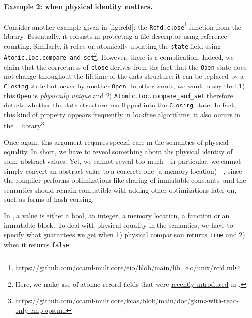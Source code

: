 \paragraph{Example 2: when physical identity matters.}

Consider another example given in \cref{fig:rcfd}: the \texttt{Rcfd.close}\footnote{\url{https://github.com/ocaml-multicore/eio/blob/main/lib_eio/unix/rcfd.ml}} function from the \Eio~\cite{eio} library.
Essentially, it consists in protecting a file descriptor using reference counting.
Similarly, it relies on atomically updating the \texttt{state} field using \texttt{Atomic.Loc.compare_and_set}\footnote{Here, we make use of atomic record fields that were \href{https://github.com/ocaml/ocaml/pull/13404}{recently introduced} in \OCaml.}.
However, there is a complication.
Indeed, we claim that the correctness of \texttt{close} derives from the fact that the \texttt{Open} state does not change throughout the lifetime of the data structure; it can be replaced by a \texttt{Closing} state but never by another \texttt{Open}.
In other words, we want to say that 1) this \texttt{Open} is \emph{physically unique} and 2) \texttt{Atomic.Loc.compare_and_set} therefore detects whether the data structure has flipped into the \texttt{Closing} state.
In fact, this kind of property appears frequently in lockfree algorithms; it also occurs in the \Kcas~\cite{kcas} library\footnote{\url{https://github.com/ocaml-multicore/kcas/blob/main/doc/gkmz-with-read-only-cmp-ops.md}}.

Once again, this argument requires special care in the semantics of physical equality.
In short, we have to reveal something about the physical identity of some abstract values.
Yet, we cannot reveal too much---in particular, we cannot simply convert an abstract value to a concrete one (a memory location)---, since the \OCaml compiler performs optimizations like sharing of immutable constants, and the semantics should remain compatible with adding other optimizations later on, such as forms of hash-consing.


In \Zoo, a value is either a bool, an integer, a memory location, a function or an immutable block.
To deal with physical equality in the semantics, we have to specify what guarantees we get when 1) physical comparison returns \texttt{true} and 2) when it returns \texttt{false}.

